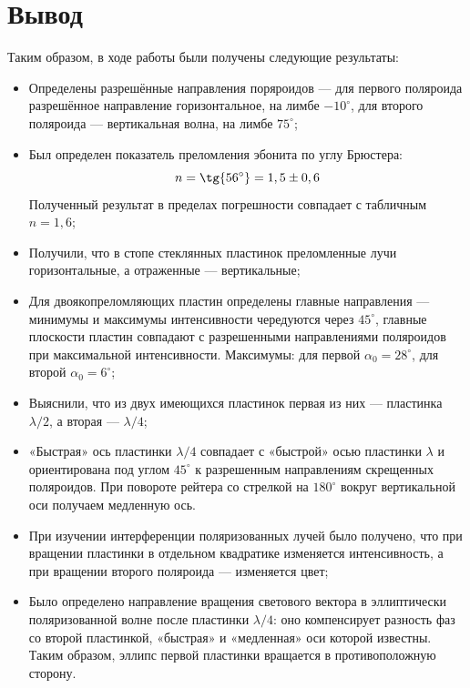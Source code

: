 \section{Вывод}
Таким образом, в ходе работы были получены следующие результаты:
\begin{itemize}
\item Определены разрешённые направления поряроидов --- для первого поляроида разрешённое направление горизонтальное, на лимбе $-10^{\circ}$, для второго поляроида --- вертикальная волна, на лимбе $75^{\circ}$;
\item Был определен показатель преломления эбонита по углу Брюстера:
\begin{equation*}
    n = \tg{56^{\circ}} = 1,5 \pm 0,6
\end{equation*}
Полученный результат в пределах погрешности совпадает с табличным $n = 1,6$;
\item Получили, что в стопе стеклянных пластинок преломленные лучи горизонтальные, а отраженные --- вертикальные;
\item Для двоякопреломляющих пластин определены главные направления --- минимумы и
максимумы интенсивности чередуются через $45^{\circ}$, главные плоскости пластин совпадают с разрешенными направлениями поляроидов при максимальной интенсивности. Максимумы: для первой $\alpha_0 = 28^{\circ}$, для второй $\alpha_0 = 6^{\circ}$;
\item Выяснили, что из двух имеющихся пластинок первая из них --- пластинка $\lambda/2$, а вторая --- $\lambda/4$;
\item «Быстрая» ось пластинки $\lambda/4$ совпадает с «быстрой» осью пластинки $\lambda$ и ориентирована под углом $45^{\circ}$ к разрешенным направлениям скрещенных поляроидов. При повороте рейтера со стрелкой на $180^{\circ}$ вокруг вертикальной оси получаем медленную ось.
\item При изучении интерференции поляризованных лучей было получено, что при вращении пластинки в отдельном квадратике изменяется интенсивность, а при вращении второго поляроида --- изменяется цвет;
\item Было определено направление вращения светового вектора в эллиптически поляризованной волне после пластинки $\lambda/4$: оно компенсирует разность фаз со второй пластинкой, «быстрая» и «медленная» оси которой известны. Таким образом, эллипс первой пластинки вращается в противоположную сторону.
\end{itemize}
